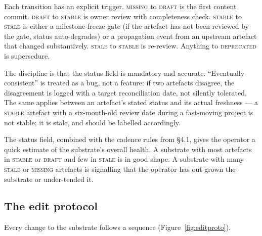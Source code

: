 \documentclass[11pt,a4paper,twocolumn]{article}
\begin{document}
Each transition has an explicit trigger. \textsc{missing} to
\textsc{draft} is the first content commit. \textsc{draft} to
\textsc{stable} is owner review with completeness check.
\textsc{stable} to \textsc{stale} is either a milestone-freeze gate
(if the artefact has not been reviewed by the gate, status
auto-degrades) or a propagation event from an upstream artefact
that changed substantively. \textsc{stale} to \textsc{stable} is
re-review. Anything to \textsc{deprecated} is supersedure.

The discipline is that the status field is mandatory and accurate.
``Eventually consistent'' is treated as a bug, not a feature: if
two artefacts disagree, the disagreement is logged with a target
reconciliation date, not silently tolerated. The same applies
between an artefact's stated status and its actual freshness --- a
\textsc{stable} artefact with a six-month-old review date during a
fast-moving project is not stable; it is stale, and should be
labelled accordingly.

The status field, combined with the cadence rules from \S4.1, gives
the operator a quick estimate of the substrate's overall
health. A substrate with most artefacts in \textsc{stable} or
\textsc{draft} and few in \textsc{stale} is in good shape. A
substrate with many \textsc{stale} or \textsc{missing} artefacts is
signalling that the operator has out-grown the substrate or
under-tended it.

\subsection{The edit protocol}

Every change to the substrate follows a sequence
(Figure~\ref{fig:editproto}).
\end{document}
